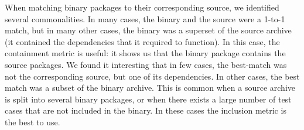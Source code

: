 When matching binary packages to their corresponding source, we identified
several commonalities. In many cases, the binary and the source were a
1-to-1 match, but in many other cases, the binary was a superset of the
source archive (it contained the dependencies that it required to
function). In this case, the containment metric is useful: it shows us that
the binary package contains the source packages.  We found it interesting
that in few cases, the best-match was not the corresponding source, but one
of its dependencies.  In other cases, the best match was a subset of the
binary archive. This is common when a source archive is split into several
binary packages, or when there exists a large number of test cases that are
not included in the binary. In these cases the inclusion metric is the best
to use.



